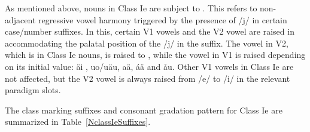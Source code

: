 As mentioned above, nouns in Class Ie are subject to \jvh. This refers to non-adjacent regressive vowel harmony triggered by the presence of /j/ in certain case/number suffixes. In this, certain V1 vowels and the V2 vowel are raised in accommodating the palatal position of the /j/ in the suffix. The vowel in V2, which is  in Class Ie nouns, is raised to , while the vowel in V1 is raised depending on its initial value: ä\ARROW i%
, uo/uä\ARROW u, %
a\ARROW ä,  á\ARROW ä and å\ARROW u. Other V1 vowels in Class Ie are not affected, but the V2 vowel is always raised from /e/ to /i/ in the relevant paradigm slots. %


The class marking suffixes and consonant gradation pattern for Class Ie are summarized in Table~\vref{NclassIeSuffixes}. %


